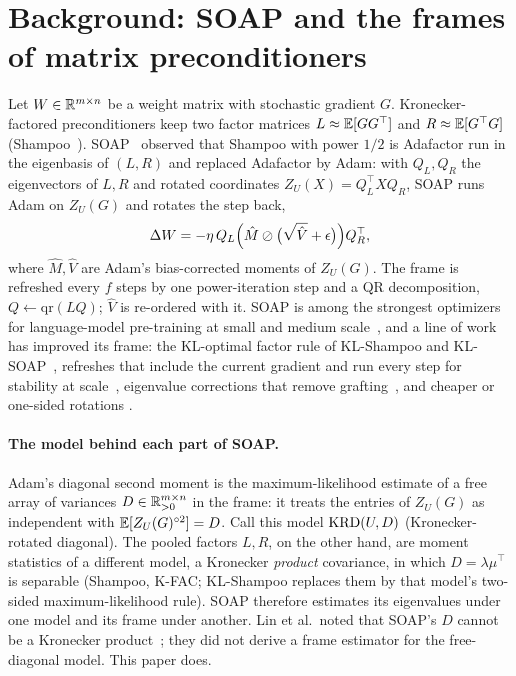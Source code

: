 \section{Background: SOAP and the frames of matrix preconditioners}
\label{sec:background}

Let $W\in\mathbb{R}^{m\times n}$ be a weight matrix with stochastic gradient $G$. Kronecker-factored
preconditioners keep two factor matrices $L\approx\mathbb{E}[GG^\top]$ and $R\approx\mathbb{E}[G^\top G]$
(Shampoo~\citep{gupta2018shampoo,anil2020scalable}). SOAP~\citep{vyas2024soap} observed that
Shampoo with power $1/2$ is Adafactor run in the eigenbasis of $(L,R)$ and replaced Adafactor by
Adam: with $Q_L,Q_R$ the eigenvectors of $L,R$ and rotated coordinates
$Z_U(X)=Q_L^\top XQ_R$, SOAP runs Adam on $Z_U(G)$ and rotates the step back,
\begin{equation}
  \Delta W = -\eta\, Q_L\Big(\hat M \oslash\big(\sqrt{\hat V}+\epsilon\big)\Big)Q_R^\top ,
  \label{eq:soap}
\end{equation}
where $\hat M,\hat V$ are Adam's bias-corrected moments of $Z_U(G)$. The frame is refreshed every
$f$ steps by one power-iteration step and a QR decomposition, $Q\leftarrow\mathrm{qr}(LQ)$;
$\hat V$ is re-ordered with it. SOAP is among the strongest optimizers for language-model
pre-training at small and medium scale~\citep{vyas2024soap,wen2025fantastic,semenov2025benchmarking},
and a line of work has improved its frame: the KL-optimal factor rule of KL-Shampoo and
KL-SOAP~\citep{lin2025klshampoo}, refreshes that include the current gradient and run every step
for stability at scale~\citep{nvidia2026soapmuon}, eigenvalue corrections that remove
grafting~\citep{eschenhagen2025purifying}, and cheaper or one-sided rotations
\citep{liu2025cosmos,gong2026aro}.

\paragraph{The model behind each part of SOAP.}
Adam's diagonal second moment is the maximum-likelihood estimate of a free array of variances
$D\in\mathbb{R}^{m\times n}_{>0}$ in the frame: it treats the entries of $Z_U(G)$ as independent with
$\mathbb{E}[Z_U(G)^{\circ2}]=D$. Call this model $\mathrm{KRD}(U,D)$ (Kronecker-rotated diagonal). The pooled
factors $L,R$, on the other hand, are moment statistics of a different model, a Kronecker
\emph{product} covariance, in which $D=\lambda\mu^\top$ is separable (Shampoo, K-FAC; KL-Shampoo
replaces them by that model's two-sided maximum-likelihood rule). SOAP therefore estimates its
eigenvalues under one model and its frame under another. Lin et al.\ noted that SOAP's $D$ cannot be a Kronecker product~\citep{lin2025klshampoo}; they
did not derive a frame estimator for the free-diagonal model. This paper does.
